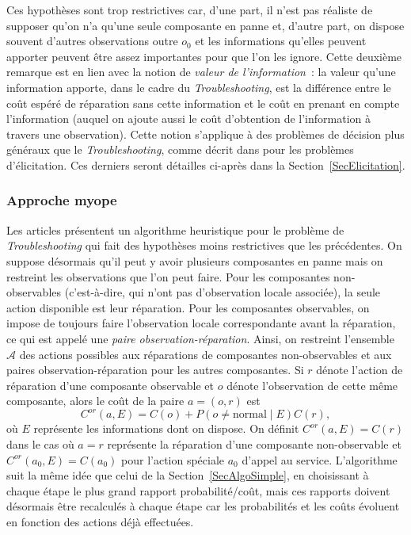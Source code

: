 \documentclass[a4paper,11pt]{article}
\theoremstyle{plain}
\theoremstyle{definition}
\begin{document}
Ces hypothèses sont trop restrictives car, d'une part, il n'est pas réaliste de supposer qu'on n'a qu'une seule composante en panne et, d'autre part, on dispose souvent d'autres observations outre $o_0$ et les informations qu'elles peuvent apporter peuvent être assez importantes pour que l'on les ignore. Cette deuxième remarque est en lien avec la notion de \emph{valeur de l'information}~: la valeur qu'une information apporte, dans le cadre du \emph{Troubleshooting}, est la différence entre le coût espéré de réparation sans cette information et le coût en prenant en compte l'information (auquel on ajoute aussi le coût d'obtention de l'information à travers une observation). Cette notion s'applique à des problèmes de décision plus généraux que le \emph{Troubleshooting}, comme décrit dans \cite{Braziunas_2008} pour les problèmes d'élicitation. Ces derniers seront détailles ci-après dans la Section~\ref{SecElicitation}.

\subsubsection{Approche myope}
\label{SecMyope}

Les articles \cite{heckerman1994troubleshooting, Heckerman_1995} présentent un algorithme heuristique pour le problème de \emph{Troubleshooting} qui fait des hypothèses moins restrictives que les précédentes. On suppose désormais qu'il peut y avoir plusieurs composantes en panne mais on restreint les observations que l'on peut faire. Pour les composantes non-observables (c'est-à-dire, qui n'ont pas d'observation locale associée), la seule action disponible est leur réparation. Pour les composantes observables, on impose de toujours faire l'observation locale correspondante avant la réparation, ce qui est appelé une \emph{paire observation-réparation}. Ainsi, on restreint l'ensemble $\mathcal A$ des actions possibles aux réparations de composantes non-observables et aux paires observation-réparation pour les autres composantes. Si $r$ dénote l'action de réparation d'une composante observable et $o$ dénote l'observation de cette même composante, alors le coût de la paire $a = (o, r)$ est
\begin{equation}
\label{EqCor}
C^{or}(a, E) = C(o) + P(o \neq \text{normal} \mid E) C(r),
\end{equation}
où $E$ représente les informations dont on dispose. On définit $C^{or}(a, E) = C(r)$ dans le cas où $a = r$ représente la réparation d'une composante non-observable et $C^{or}(a_0, E) = C(a_0)$ pour l'action spéciale $a_0$ d'appel au service. L'algorithme suit la même idée que celui de la Section~\ref{SecAlgoSimple}, en choisissant à chaque étape le plus grand rapport probabilité/coût, mais ces rapports doivent désormais être recalculés à chaque étape car les probabilités et les coûts évoluent en fonction des actions déjà effectuées.
\end{document}

